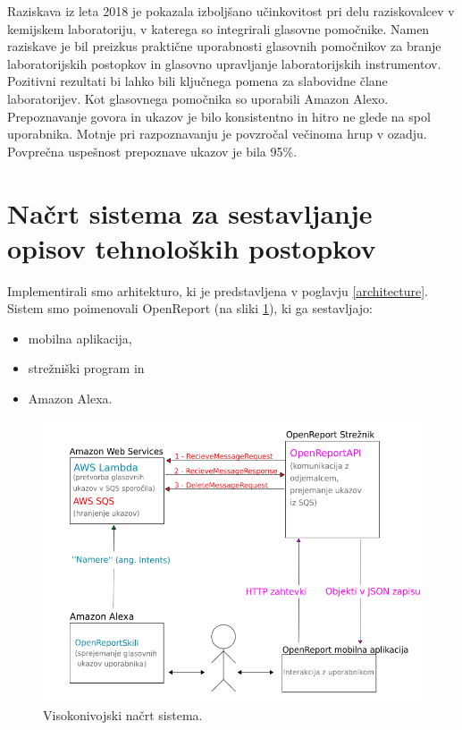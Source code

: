 \documentclass[a4paper, 12pt]{book}
\begin{document}
Raziskava iz leta 2018 \cite{austerjost2018introducing} je pokazala izboljšano učinkovitost pri delu raziskovalcev v kemijskem laboratoriju, v katerega so integrirali glasovne pomočnike.
Namen raziskave je bil preizkus praktične uporabnosti glasovnih pomočnikov za branje laboratorijskih postopkov in glasovno upravljanje laboratorijskih instrumentov.
Pozitivni rezultati bi lahko bili ključnega pomena za slabovidne člane laboratorijev.
Kot glasovnega pomočnika so uporabili Amazon Alexo.
Prepoznavanje govora in ukazov je bilo konsistentno in hitro ne glede na spol uporabnika.
Motnje pri razpoznavanju je povzročal večinoma hrup v ozadju.
Povprečna uspešnost prepoznave ukazov je bila 95\%.




\section{Načrt sistema za sestavljanje opisov tehnoloških postopkov}

Implementirali smo arhitekturo, ki je predstavljena v poglavju \ref{architecture}.
Sistem smo poimenovali OpenReport (na sliki \ref{plan}), ki ga sestavljajo:
\begin{itemize}
	\item mobilna aplikacija,
	\item strežniški program in 
	\item Amazon Alexa.
\end{itemize}

\begin{figure}[H]
\begin{center}
\includegraphics[width=13cm]{plan}
\end{center}
\caption{Visokonivojski načrt sistema.}
\label{plan}
\end{figure}
\end{document}
